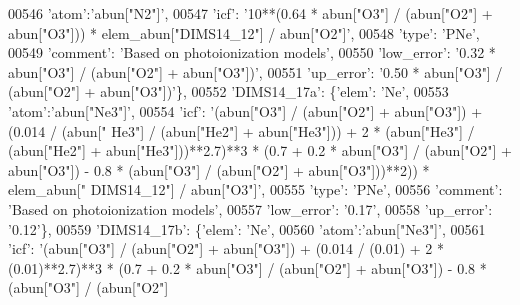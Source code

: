 \begin{DoxyCode}
00546                                        \textcolor{stringliteral}{'atom'}:\textcolor{stringliteral}{'abun["N2"]'}, 
00547                                        \textcolor{stringliteral}{'icf'}: \textcolor{stringliteral}{'10**(0.64 * abun["O3"] / (abun["O2"] + abun["O3"])) *
       elem\_abun["DIMS14\_12"] / abun["O2"]'},
00548                                        \textcolor{stringliteral}{'type'}: \textcolor{stringliteral}{'PNe'},
00549                                        \textcolor{stringliteral}{'comment'}: \textcolor{stringliteral}{'Based on photoionization models'},
00550                                        \textcolor{stringliteral}{'low\_error'}: \textcolor{stringliteral}{'0.32 * abun["O3"] / (abun["O2"] + abun["O3"])'},
00551                                        \textcolor{stringliteral}{'up\_error'}: \textcolor{stringliteral}{'0.50 * abun["O3"] / (abun["O2"] + abun["O3"])'}\},
00552                          \textcolor{stringliteral}{'DIMS14\_17a'}: \{\textcolor{stringliteral}{'elem'}: \textcolor{stringliteral}{'Ne'},
00553                                        \textcolor{stringliteral}{'atom'}:\textcolor{stringliteral}{'abun["Ne3"]'}, 
00554                                        \textcolor{stringliteral}{'icf'}: \textcolor{stringliteral}{'(abun["O3"] / (abun["O2"] + abun["O3"]) + (0.014 / (abun["
      He3"] / (abun["He2"] + abun["He3"])) + 2 * (abun["He3"] / (abun["He2"] + abun["He3"]))**2.7)**3 * (0.7 + 0.2 *
       abun["O3"] / (abun["O2"] + abun["O3"]) - 0.8 * (abun["O3"] / (abun["O2"] + abun["O3"]))**2)) * elem\_abun["
      DIMS14\_12"] / abun["O3"]'},
00555                                        \textcolor{stringliteral}{'type'}: \textcolor{stringliteral}{'PNe'},
00556                                        \textcolor{stringliteral}{'comment'}: \textcolor{stringliteral}{'Based on photoionization models'},
00557                                        \textcolor{stringliteral}{'low\_error'}: \textcolor{stringliteral}{'0.17'},
00558                                        \textcolor{stringliteral}{'up\_error'}: \textcolor{stringliteral}{'0.12'}\},
00559                          \textcolor{stringliteral}{'DIMS14\_17b'}: \{\textcolor{stringliteral}{'elem'}: \textcolor{stringliteral}{'Ne'},
00560                                        \textcolor{stringliteral}{'atom'}:\textcolor{stringliteral}{'abun["Ne3"]'}, 
00561                                        \textcolor{stringliteral}{'icf'}: \textcolor{stringliteral}{'(abun["O3"] / (abun["O2"] + abun["O3"]) + (0.014 / (0.01) +
       2 * (0.01)**2.7)**3 * (0.7 + 0.2 * abun["O3"] / (abun["O2"] + abun["O3"]) - 0.8 * (abun["O3"] / (abun["O2"]
}
\end{DoxyCode}
